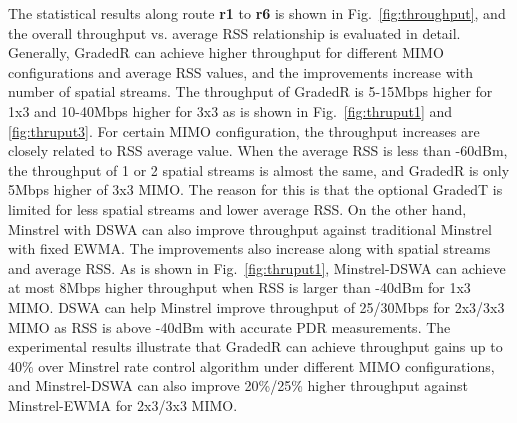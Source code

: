The statistical results along route \textbf{r1} to \textbf{r6} is shown in Fig.~\ref{fig:throughput}, and the overall throughput vs. average RSS relationship is evaluated in detail. Generally, GradedR can achieve higher throughput for different MIMO configurations and average RSS values, and the improvements increase with number of spatial streams. The throughput of GradedR is 5-15Mbps higher for 1x3 and 10-40Mbps higher for 3x3 as is shown in Fig.~\ref{fig:thruput1} and \ref{fig:thruput3}. For certain MIMO configuration, the throughput increases are closely related to RSS average value. When the average RSS is less than -60dBm, the throughput of 1 or 2 spatial streams is almost the same, and GradedR is only 5Mbps higher of 3x3 MIMO. The reason for this is that the optional GradedT is limited for less spatial streams and lower average RSS. On the other hand, Minstrel with DSWA can also improve throughput against traditional Minstrel with fixed EWMA. The improvements also increase along with spatial streams and average RSS. As is shown in Fig.~\ref{fig:thruput1}, Minstrel-DSWA can achieve at most 8Mbps higher throughput when RSS is larger than -40dBm for 1x3 MIMO. DSWA can help Minstrel improve throughput of 25/30Mbps for 2x3/3x3 MIMO as RSS is above -40dBm with accurate PDR measurements. The experimental results illustrate that GradedR can achieve throughput gains up to 40\% over Minstrel rate control algorithm under different MIMO configurations, and Minstrel-DSWA can also improve 20\%/25\% higher throughput against Minstrel-EWMA for 2x3/3x3 MIMO.
